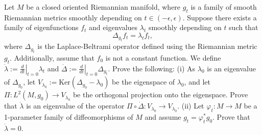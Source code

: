 \begin{exercise}
\label{geometry:2024:6}
Let $M$ be a closed oriented Riemannian manifold, where $g_t$ is a family of smooth Riemannian metrics smoothly depending on $t \in (-\epsilon, \epsilon)$. Suppose there exists a family of eigenfunctions $f_t$ and eigenvalues $\lambda_t$ smoothly depending on $t$ such that
\[
\Delta_{g_t} f_t = \lambda_t f_t,
\]
where $\Delta_{g_t}$ is the Laplace-Beltrami operator defined using the Riemannian metric $g_t$. Additionally, assume that $f_0$ is not a constant function. We define $\dot{\lambda} := \left.\frac{d}{dt}\right|_{t=0} \lambda_t$ and $\dot{\Delta} := \left.\frac{d}{dt}\right|_{t=0} \Delta_{g_t}$. Prove the following:
(i) As $\lambda_0$ is an eigenvalue of $\Delta_{g_0}$, let $V_{\lambda_0} := \mathrm{Ker}(\Delta_{g_0} - \lambda_0)$ be the eigenspace of $\lambda_0$, and let $\Pi : L^2(M, g_0) \to V_{\lambda_0}$ be the orthogonal projection onto the eigenspace. Prove that $\dot{\lambda}$ is an eigenvalue of the operator $\Pi \circ \dot{\Delta} : V_{\lambda_0} \to V_{\lambda_0}$.
(ii) Let $\varphi_t : M \to M$ be a 1-parameter family of diffeomorphisms of $M$ and assume $g_t = \varphi_t^* g_0$. Prove that $\dot{\lambda} = 0$.
\end{exercise}

